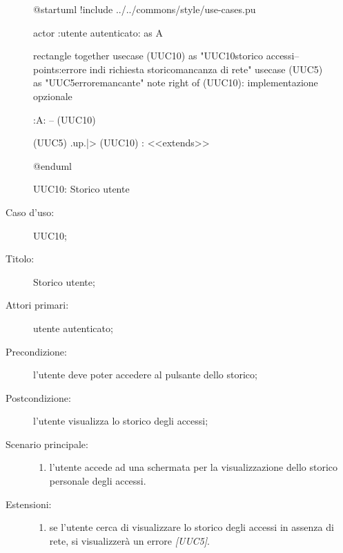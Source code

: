 \documentclass[../../../analisi-dei-requisiti.tex]{subfiles}
\begin{document}
\begin{figure}[H]
  \centering
  \begin{plantuml}
  @startuml
  !include ../../commons/style/use-cases.pu

  actor :utente autenticato: as A

  rectangle {
    together {
      usecase (UUC10) as "UUC10\nVisualizzazione storico accessi\n--\nExtension points:\nVisualizzazione errore in\ncaso di richiesta storico\nin mancanza di rete"
      usecase (UUC5) as "UUC5\nVisualizzazione errore\nrete mancante"
      note right of (UUC10): implementazione opzionale
    }
  }

  :A: -- (UUC10)

  (UUC5) .up.|> (UUC10) : <<extends>>

  @enduml
  \end{plantuml}
  \caption{UUC10: Storico utente}%
  \label{fig:uuc10}
\end{figure}

\begin{description}
  \item[Caso d’uso:] UUC10;
  \item[Titolo:] Storico utente;
  \item[Attori primari:] utente autenticato;
  \item[Precondizione:]  l'utente deve poter accedere al pulsante dello storico;
  \item[Postcondizione:] l'utente visualizza lo storico degli accessi;
  \item[Scenario principale:]
        \begin{enumerate}
          \item l'utente accede ad una schermata per la visualizzazione dello storico personale degli accessi.
        \end{enumerate}
  \item[Estensioni:]
        \begin{enumerate}
          \item se l'utente cerca di visualizzare lo storico degli accessi in assenza di rete, si visualizzerà un errore \emph{[UUC5]}.
        \end{enumerate}
\end{description}
\end{document}
